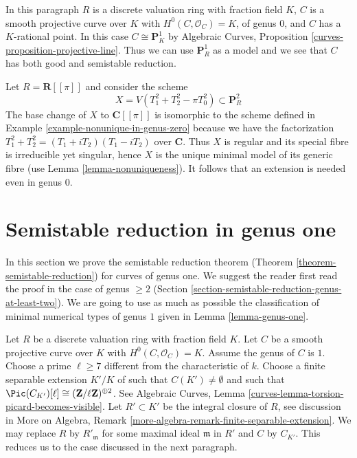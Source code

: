 \medskip\noindent
In this paragraph $R$ is a discrete valuation ring with fraction field $K$,
$C$ is a smooth projective curve over $K$ with $H^0(C, \mathcal{O}_C) = K$,
of genus $0$, and $C$ has a $K$-rational point. In this case
$C \cong \mathbf{P}^1_K$ by
Algebraic Curves, Proposition \ref{curves-proposition-projective-line}.
Thus we can use $\mathbf{P}^1_R$ as a model and we see that
$C$ has both good and semistable reduction.

\begin{example}
\label{example-extension-necessary-genus-zero}
Let $R = \mathbf{R}[[\pi]]$ and consider the scheme
$$
X = V(T_1^2 + T_2^2 - \pi T_0^2) \subset \mathbf{P}^2_R
$$
The base change of $X$ to $\mathbf{C}[[\pi]]$ is isomorphic
to the scheme defined in Example \ref{example-nonunique-in-genus-zero}
because we have the factorization $T_1^2 + T_2^2 = (T_1 + iT_2)(T_1 - iT_2)$
over $\mathbf{C}$.
Thus $X$ is regular and its special fibre is irreducible yet singular,
hence $X$ is the unique minimal model of its generic fibre
(use Lemma \ref{lemma-nonuniqueness}).
It follows that an extension is needed even in genus $0$.
\end{example}



\section{Semistable reduction in genus one}
\label{section-semistable-reduction-genus-one}

\noindent
In this section we prove the semistable reduction theorem
(Theorem \ref{theorem-semistable-reduction}) for curves of genus one.
We suggest the reader first read the proof in the case of genus $\geq 2$
(Section \ref{section-semistable-reduction-genus-at-least-two}).
We are going to use as much as possible the classification of
minimal numerical types of genus $1$ given in
Lemma \ref{lemma-genus-one}.

\medskip\noindent
Let $R$ be a discrete valuation ring with fraction field $K$.
Let $C$ be a smooth projective curve over $K$ with $H^0(C, \mathcal{O}_C) = K$.
Assume the genus of $C$ is $1$.
Choose a prime $\ell \geq 7$ different from the characteristic of $k$.
Choose a finite separable extension $K'/K$ of
such that $C(K') \not = \emptyset$ and such that
$\Pic(C_{K'})[\ell] \cong (\mathbf{Z}/\ell \mathbf{Z})^{\oplus 2}$.
See
Algebraic Curves, Lemma \ref{curves-lemma-torsion-picard-becomes-visible}.
Let $R' \subset K'$ be the integral closure of $R$, see
discussion in More on Algebra, Remark
\ref{more-algebra-remark-finite-separable-extension}.
We may replace $R$ by $R'_{\mathfrak m}$ for some maximal ideal
$\mathfrak m$ in $R'$ and $C$ by $C_{K'}$. This
reduces us to the case discussed in the next paragraph.

